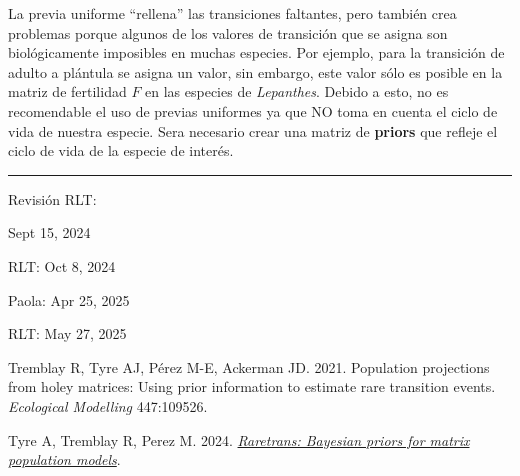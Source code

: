 \documentclass[
  12pt,
  letterpaper,
]{book}
\newlength{\cslhangindent}
\newenvironment{CSLReferences}[2] %
 {\begin{list}{}{%
  \setlength{\itemindent}{0pt}
  \setlength{\leftmargin}{0pt}
  \setlength{\parsep}{0pt}
  \ifodd #1
   \setlength{\leftmargin}{\cslhangindent}
   \setlength{\itemindent}{-1\cslhangindent}
  \fi
  \setlength{\itemsep}{#2\baselineskip}}}
 {\end{list}}
\begin{document}
La previa uniforme ``rellena'' las transiciones faltantes, pero también
crea problemas porque algunos de los valores de transición que se asigna
son biológicamente imposibles en muchas especies. Por ejemplo, para la
transición de adulto a plántula se asigna un valor, sin embargo, este
valor sólo es posible en la matriz de fertilidad \(F\) en las especies
de \emph{Lepanthes}. Debido a esto, no es recomendable el uso de previas
uniformes ya que NO toma en cuenta el ciclo de vida de nuestra especie.
Sera necesario crear una matriz de \textbf{priors} que refleje el ciclo
de vida de la especie de interés.

\begin{center}\rule{0.5\linewidth}{0.5pt}\end{center}

Revisión RLT:

Sept 15, 2024

RLT: Oct 8, 2024

Paola: Apr 25, 2025

RLT: May 27, 2025

\label{refs}
\begin{CSLReferences}{1}{0}
Tremblay R, Tyre AJ, Pérez M-E, Ackerman JD. 2021. Population
projections from holey matrices: Using prior information to estimate
rare transition events. \emph{Ecological Modelling} 447:109526.

Tyre A, Tremblay R, Perez M. 2024.
\emph{\href{https://github.com/atyre2/raretrans}{Raretrans: Bayesian
priors for matrix population models}}.

\end{CSLReferences}


\backmatter
\end{document}
